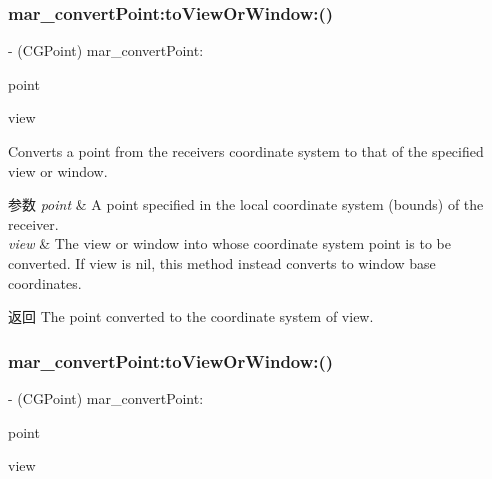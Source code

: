 \subsubsection{\texorpdfstring{mar\+\_\+convert\+Point\+:to\+View\+Or\+Window\+:()}{mar\_convertPoint:toViewOrWindow:()}\hspace{0.1cm}{\footnotesize\ttfamily [1/2]}}
{\footnotesize\ttfamily -\/ (C\+G\+Point) mar\+\_\+convert\+Point\+: \begin{DoxyParamCaption}\item[{(C\+G\+Point)}]{point }\item[{toViewOrWindow:(nullable U\+I\+View $\ast$)}]{view }\end{DoxyParamCaption}}

Converts a point from the receiver\textquotesingle{}s coordinate system to that of the specified view or window.


\begin{DoxyParams}{参数}
{\em point} & A point specified in the local coordinate system (bounds) of the receiver. \\
\hline
{\em view} & The view or window into whose coordinate system point is to be converted. If view is nil, this method instead converts to window base coordinates. \\
\hline
\end{DoxyParams}
\begin{DoxyReturn}{返回}
The point converted to the coordinate system of view. 
\end{DoxyReturn}
\mbox{\label{category_u_i_view_07_m_a_r_e_x_08_a7584650ebf859d31666da3b3c553a87c}} 
\subsubsection{\texorpdfstring{mar\+\_\+convert\+Point\+:to\+View\+Or\+Window\+:()}{mar\_convertPoint:toViewOrWindow:()}\hspace{0.1cm}{\footnotesize\ttfamily [2/2]}}
{\footnotesize\ttfamily -\/ (C\+G\+Point) mar\+\_\+convert\+Point\+: \begin{DoxyParamCaption}\item[{(C\+G\+Point)}]{point }\item[{toViewOrWindow:(U\+I\+View $\ast$)}]{view }\end{DoxyParamCaption}\hspace{0.3cm}{\ttfamily [implementation]}}

